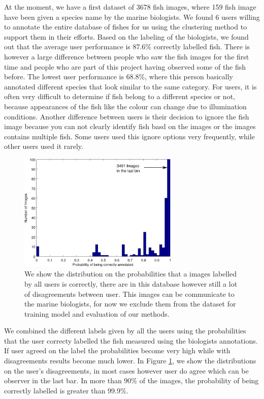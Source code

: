 At the moment, we have a first dataset of 3678 fish images, where 159 fish image have been given
a species name by the marine biologists. We found 6 users willing to annotate the entire database
of fishes for us using the clustering method to support them in their efforts. Based on the 
labeling of the biologists, we found out that the average user performance is 87.6\% correctly
labelled fish. There is however a large difference between people who saw the fish images
for the first time and people who are part of this project having observed some of the fish before.
The lowest user performance is 68.8\%, where this person basically annotated different species
that look similar to the same category. For users, it is often very difficult to determine if
fish belong to a different species or not, because appearances of the fish like the colour can
change due to illumination conditions. Another difference between users is their decision to 
ignore the fish image because you can not clearly identify fish basd on the images or the images
contains multiple fish. Some users used this ignore options very frequently, while other users
used it rarely. 

\begin{figure}
\begin{center}
\includegraphics[width=3in]{distributionofdataset2}
\caption{We show the distribution on the probabilities that a images labelled by all users
is correctly, there are in this database however still a lot of disagreements between user. 
This images can be communicate to the marine biologists, for now we exclude them from the
dataset for training model and evaluation of our methods.}
\label{fig:distributionofdata}
\end{center}
\end{figure}

We combined the different labels given by all the users using the probabilities that the user
correcty labelled the fish measured using the biologists annotations. If user agreed on the label
the probabilities become very high while with disagreements results become much lower. In
Figure \ref{fig:distributionofdata}, we show the distributions on the user's disagreements,
in most cases however user do agree which can be observer in the last bar. In more than
90\% of the images, the probability of being correctly labelled is greater than 99.9\%.\\ 

